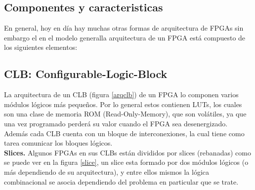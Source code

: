 \documentclass[twoside,spanish,ESP,MSc]{plantillaLabUPV}
\theoremstyle{definition}
\newcommand{\f}{FPGA }
\newcommand{\fs}{FPGAs }
\begin{document}
\subsection{Componentes y caracteristicas}

En general, hoy en día hay muchas otras formas de arquitectura de FPGAs sin embargo el en el modelo generalla arquitectura de un \f está compuesto de los siguientes elementos:


\subsection*{CLB: Configurable-Logic-Block}

La arquitectura de un CLB (figura \ref{arqclb}) de un \f lo componen varios módulos lógicos más pequeños. Por lo general estos contienen LUTs, los cuales son una clase de memoria ROM (Read-Only-Memory), que son volátiles, ya que una vez programado perderá su valor cuando el \f sea desenergizado. Además cada CLB cuenta con un bloque de interconexiones, la cual tiene como tarea comunicar los bloques lógicos.\\



\checkmark\textbf{Slices.} Algunos \fs en sus CLBs están divididos por slices (rebanadas) como se puede ver en la figura \ref{slice}, un slice esta formado por dos módulos lógicos (o más dependiendo de su arquitectura), y entre ellos mismos la lógica combinacional se asocia dependiendo del problema en particular que se trate.\\

\end{document}
